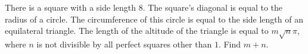 There is a square with a side length $8$. The square's diagonal is equal to the radius of a circle. The circumference of this circle is equal to the side length of an equilateral triangle. The length of the altitude of the triangle is equal to $m \sqrt{ n} \pi$, where $n$ is not divisible by all perfect squares other than $1$. Find $m + n$.
